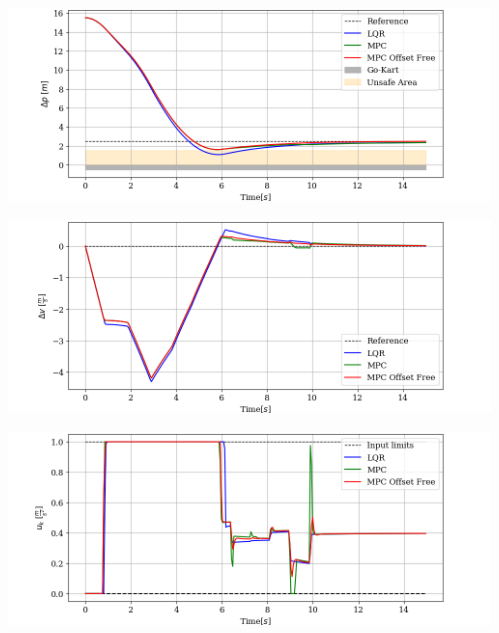 \documentclass[9pt, aspectratio=169]{beamer}
\begin{document}
\begin{frame}
\begin{columns}
\begin{column}{0.57\textwidth}
\end{column}
\begin{column}{0.43\textwidth}
	\begin{center}
  		\includegraphics[width=1\textwidth]{Coleman/Deltap} 
	\end{center}
	\vspace{-0.4cm}
	\begin{center}
  		\includegraphics[width=1\textwidth]{Coleman/Deltav} 
	\end{center}
	\vspace{-0.4cm}
	\begin{center}
  		\includegraphics[width=1\textwidth]{Coleman/Input} 
	\end{center}
\end{column}
\end{columns}
\end{frame}
\end{document}
